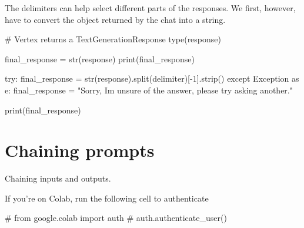 \documentclass[
  letterpaper,
  DIV=11,
  numbers=noendperiod]{scrreprt}
\newenvironment{Shaded}{\begin{snugshade}}{\end{snugshade}}
\newcommand{\BuiltInTok}[1]{\textcolor[rgb]{0.00,0.23,0.31}{#1}}
\newcommand{\CommentTok}[1]{\textcolor[rgb]{0.37,0.37,0.37}{#1}}
\newcommand{\ControlFlowTok}[1]{\textcolor[rgb]{0.00,0.23,0.31}{#1}}
\newcommand{\DecValTok}[1]{\textcolor[rgb]{0.68,0.00,0.00}{#1}}
\newcommand{\ImportTok}[1]{\textcolor[rgb]{0.00,0.46,0.62}{#1}}
\newcommand{\NormalTok}[1]{\textcolor[rgb]{0.00,0.23,0.31}{#1}}
\newcommand{\OperatorTok}[1]{\textcolor[rgb]{0.37,0.37,0.37}{#1}}
\newcommand{\PreprocessorTok}[1]{\textcolor[rgb]{0.68,0.00,0.00}{#1}}
\newcommand{\StringTok}[1]{\textcolor[rgb]{0.13,0.47,0.30}{#1}}
\begin{document}
The delimiters can help select different parts of the responses. We
first, however, have to convert the object returned by the chat into a
string.

\begin{Shaded}
\begin{Highlighting}[]
\CommentTok{\# Vertex returns a TextGenerationResponse}
\BuiltInTok{type}\NormalTok{(response)}
\end{Highlighting}
\end{Shaded}

\begin{Shaded}
\begin{Highlighting}[]
\NormalTok{final\_response }\OperatorTok{=} \BuiltInTok{str}\NormalTok{(response)}
\BuiltInTok{print}\NormalTok{(final\_response)}
\end{Highlighting}
\end{Shaded}

\begin{Shaded}
\begin{Highlighting}[]
\ControlFlowTok{try}\NormalTok{:}
\NormalTok{    final\_response }\OperatorTok{=} \BuiltInTok{str}\NormalTok{(response).split(delimiter)[}\OperatorTok{{-}}\DecValTok{1}\NormalTok{].strip()}
\ControlFlowTok{except} \PreprocessorTok{Exception} \ImportTok{as}\NormalTok{ e:}
\NormalTok{    final\_response }\OperatorTok{=} \StringTok{"Sorry, I\textquotesingle{}m unsure of the answer, please try asking another."}

\BuiltInTok{print}\NormalTok{(final\_response)}
\end{Highlighting}
\end{Shaded}


\hypertarget{chaining-prompts}{%
\chapter{Chaining prompts}\label{chaining-prompts}}

Chaining inputs and outputs.

If you're on Colab, run the following cell to authenticate

\begin{Shaded}
\begin{Highlighting}[]
\CommentTok{\# from google.colab import auth}
\CommentTok{\# auth.authenticate\_user()}
\end{Highlighting}
\end{Shaded}
\end{document}
